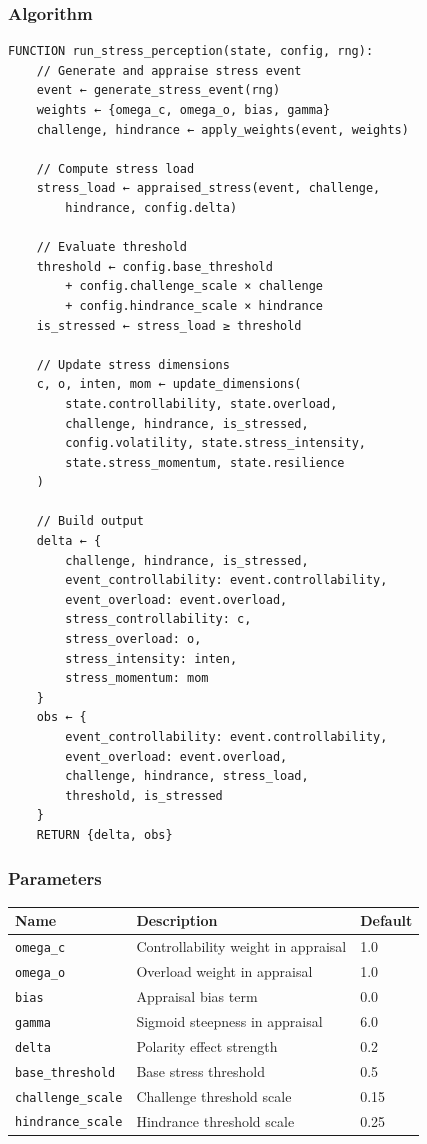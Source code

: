 \documentclass[
  letterpaper,
  DIV=11,
  numbers=noendperiod]{scrartcl}
\newcommand{\trow}[3]{%
  \texttt{\allowbreak #1} & #2 & #3 \\
}
\begin{document}
\subsubsection{Algorithm}\label{algorithm-1}

\begin{verbatim}
FUNCTION run_stress_perception(state, config, rng):
    // Generate and appraise stress event
    event ← generate_stress_event(rng)
    weights ← {omega_c, omega_o, bias, gamma}
    challenge, hindrance ← apply_weights(event, weights)

    // Compute stress load
    stress_load ← appraised_stress(event, challenge,
        hindrance, config.delta)

    // Evaluate threshold
    threshold ← config.base_threshold
        + config.challenge_scale × challenge
        + config.hindrance_scale × hindrance
    is_stressed ← stress_load ≥ threshold

    // Update stress dimensions
    c, o, inten, mom ← update_dimensions(
        state.controllability, state.overload,
        challenge, hindrance, is_stressed,
        config.volatility, state.stress_intensity,
        state.stress_momentum, state.resilience
    )

    // Build output
    delta ← {
        challenge, hindrance, is_stressed,
        event_controllability: event.controllability,
        event_overload: event.overload,
        stress_controllability: c,
        stress_overload: o,
        stress_intensity: inten,
        stress_momentum: mom
    }
    obs ← {
        event_controllability: event.controllability,
        event_overload: event.overload,
        challenge, hindrance, stress_load,
        threshold, is_stressed
    }
    RETURN {delta, obs}
\end{verbatim}

\subsubsection{Parameters}\label{parameters-1}

\begin{tabularx}{\textwidth}{p{4.5cm}Xp{2cm}}
\toprule
\textbf{Name} & \textbf{Description} & \textbf{Default} \\
\midrule
\trow{omega\_c}{Controllability weight in appraisal}{1.0}
\trow{omega\_o}{Overload weight in appraisal}{1.0}
\trow{bias}{Appraisal bias term}{0.0}
\trow{gamma}{Sigmoid steepness in appraisal}{6.0}
\trow{delta}{Polarity effect strength}{0.2}
\trow{base\_threshold}{Base stress threshold}{0.5}
\trow{challenge\_scale}{Challenge threshold scale}{0.15}
\trow{hindrance\_scale}{Hindrance threshold scale}{0.25}
\bottomrule
\end{tabularx}
\end{document}

